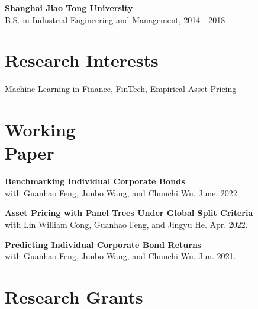\documentclass[margin]{res}
\begin{document}
\begin{resume}
\textbf{Shanghai Jiao Tong University}\\
{B.S. in Industrial Engineering and Management, 2014 - 2018}

\vspace{5mm}

\section{\sc Research Interests}
{Machine Learning in Finance, FinTech, Empirical Asset Pricing}

%

\vspace{5mm}

\section{\sc Working \\ Paper}

\textbf{Benchmarking Individual Corporate Bonds \\}
with Guanhao Feng, Junbo Wang, and Chunchi Wu.  June. 2022.

\textbf{Asset Pricing with Panel Trees Under Global Split Criteria \\}
with Lin William Cong, Guanhao Feng, and Jingyu He. Apr. 2022. 

\textbf{Predicting Individual Corporate Bond Returns \\}
with Guanhao Feng, Junbo Wang, and Chunchi Wu. Jun. 2021.


\vspace{5mm}



\section{\sc Research Grants}


\end{resume}
\end{document}
